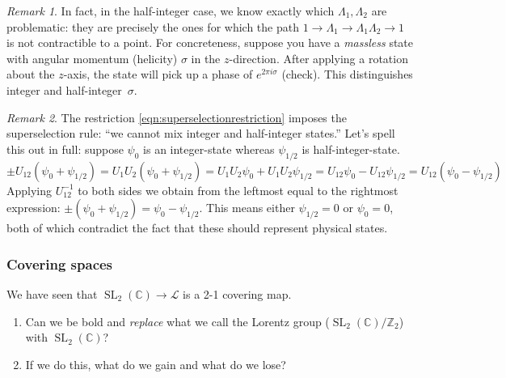 \documentclass[10pt]{article}
\newcommand{\bZ}{\mathbb Z}
\newcommand{\bC}{\mathbb{C}}
\newcommand{\ms}{\mathscr}
\newcommand{\sg}{\sigma}
\theoremstyle{plain}
\theoremstyle{definition}
\theoremstyle{remark}
\newtheorem*{remark}{Remark}
\DeclareMathOperator{\SL}{SL}
\begin{document}
\begin{remark}
    In fact, in the half-integer case, we know exactly which
    $\Lambda_1,\Lambda_2$ are problematic: they are precisely the ones
    for which the path $1\to\Lambda_1\to\Lambda_1\Lambda_2\to1$ is not
    contractible to a point. 
    For concreteness, suppose you have a \emph{massless} state with
    angular momentum (helicity) $\sg$ in the $z$-direction. After
    applying a rotation about the $z$-axis, the state will pick up a
    phase of $e^{2\pi i\sg}$ (check). This distinguishes integer and
    \mbox{half-integer $\sg$.}
\end{remark}
\begin{remark}
    The restriction \eqref{eqn:superselectionrestriction} imposes the
    superselection rule: ``we cannot mix integer and half-integer
    states.'' Let's spell this out in full: suppose $\psi_0$ is an
    integer-state whereas $\psi_{1/2}$ is half-integer-state.
    \[ \pm U_{12}(\psi_0 + \psi_{1/2}) = U_1U_2(\psi_0 + \psi_{1/2}) 
    = U_1U_2\psi_0 + U_1U_2\psi_{1/2} = U_{12}\psi_0 - U_{12}\psi_{1/2}
    = U_{12}(\psi_0-\psi_{1/2})\]
    Applying $U_{12}^{-1}$ to both sides we obtain from the leftmost
    equal to the rightmost expression: $\pm(\psi_0+\psi_{1/2}) =
    \psi_0-\psi_{1/2}$. This means either $\psi_{1/2}=0$ or
    $\psi_0=0$, both of which contradict the fact that these should
    represent physical states.
\end{remark}

\subsubsection{Covering spaces}
We have seen that $\SL_2(\bC) \to \ms L$ is a 2-1 covering map.
\begin{mdframed}[%
linewidth=2,roundcorner=10pt,leftmargin=20,
rightmargin=20,backgroundcolor= yellow!40,
linecolor=blue!70!black,frametitle=Question: What should we call the
Lorentz group?] 
    \begin{enumerate}
            \vspace{-.2cm}
        \item  Can we be bold and \emph{replace} what we call the
            Lorentz group ($\SL_2(\bC)/\bZ_2$) with $\SL_2(\bC)$?
            \vspace{-.2cm}
        \item If we do this, what do we gain and what do we lose?
    \end{enumerate}
\end{mdframed}
\end{document}
